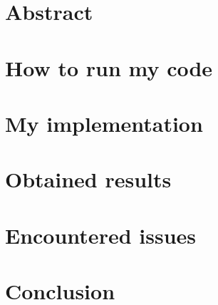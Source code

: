 \documentclass{report}
\begin{document}


\chapter*{Abstract}


\tableofcontents

\chapter{How to run my code}


\chapter{My implementation}


\chapter{Obtained results}


\chapter{Encountered issues}


\chapter*{Conclusion}


\listofalgorithms
{}
\end{document}

